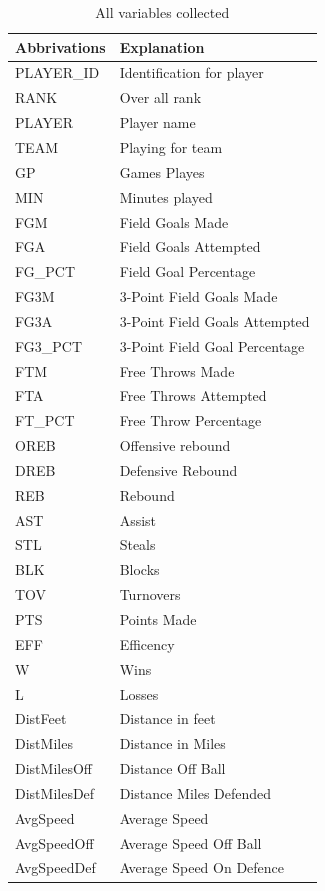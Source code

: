 \documentclass{article}
\begin{document}
\begin{table}[ht]
\centering
\begin{tabular}{ll}
  \hline
Abbrivations & Explanation \\ 
  \hline
PLAYER\_ID & Identification for player \\ 
  RANK & Over all rank \\ 
  PLAYER & Player name \\ 
  TEAM & Playing for team \\ 
  GP & Games Playes \\ 
  MIN & Minutes played \\ 
  FGM & Field Goals Made \\ 
  FGA & Field Goals Attempted \\ 
  FG\_PCT & Field Goal Percentage \\ 
  FG3M & 3-Point Field Goals Made \\ 
  FG3A & 3-Point Field Goals Attempted \\ 
  FG3\_PCT & 3-Point Field Goal Percentage \\ 
  FTM & Free Throws Made \\ 
  FTA & Free Throws Attempted \\ 
  FT\_PCT & Free Throw Percentage \\ 
  OREB & Offensive rebound \\ 
  DREB & Defensive Rebound \\ 
  REB & Rebound \\ 
  AST & Assist \\ 
  STL & Steals \\ 
  BLK & Blocks \\ 
  TOV & Turnovers \\ 
  PTS & Points Made \\ 
  EFF & Efficency \\ 
  W & Wins \\ 
  L & Losses \\ 
  DistFeet & Distance in feet \\ 
  DistMiles & Distance in Miles \\ 
  DistMilesOff & Distance Off Ball \\ 
  DistMilesDef & Distance Miles Defended \\ 
  AvgSpeed & Average Speed \\ 
  AvgSpeedOff & Average Speed Off Ball \\ 
  AvgSpeedDef & Average Speed On Defence \\ 
   \hline
\end{tabular}
\caption{All variables collected} 
\end{table}
\end{document}
